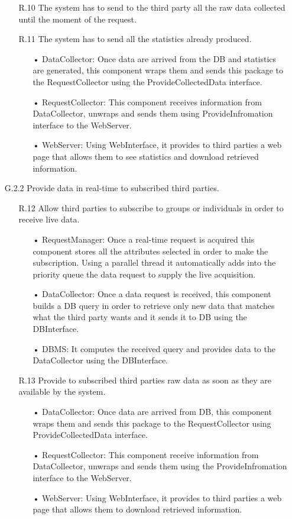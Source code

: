 \begin{enumerate}
\begin{enumerate}
	\item [R.10] The system has to send to the third party all the raw data collected until the moment of the request.
	\item [R.11] The system has to send all the statistics already produced.
		\begin{enumerate}
		\item[•] DataCollector: Once data are arrived from the DB and statistics are generated, this component wraps them and sends this package to the RequestCollector using the ProvideCollectedData interface.
		\item[•] RequestCollector: This component receives information from DataCollector, unwraps and sends them using ProvideInfromation interface to the WebServer.
		\item[•] WebServer: Using WebInterface, it provides to third parties a web page that allows them to see statistics and download retrieved information.
		\end{enumerate}	
	\end{enumerate}

\item [G.2.2] Provide data in real-time to subscribed third parties.
	\begin{enumerate}
	\item [R.12] Allow third parties to subscribe to groups or individuals in order to receive live data.
		\begin{enumerate}
		\item[•] RequestManager: Once a real-time request is acquired this component stores all the attributes selected in order to make the subscription. Using a parallel thread it automatically adds into the priority queue the data request to supply the live acquisition.
		\item[•] DataCollector: Once a data request is received, this component builds a DB query in order to retrieve only new data that matches what the third party wants and it sends it to DB using the DBInterface.
		\item[•] DBMS: It computes the received query and provides data to the DataCollector using the DBInterface.
		\end{enumerate}	
			
	\item [R.13] Provide to subscribed third parties raw data as soon as they are available by the system.
		\begin{enumerate}
		\item[•] DataCollector: Once data are arrived from DB, this component wraps them and sends this package to the RequestCollector using ProvideCollectedData interface.
		\item[•] RequestCollector: This component receive information from DataCollector, unwraps and sends them using the ProvideInfromation interface to the WebServer.
		\item[•] WebServer: Using WebInterface, it provides to third parties a web page that allows them to download retrieved information.
		\end{enumerate}	
	\end{enumerate}
	

\end{enumerate}
